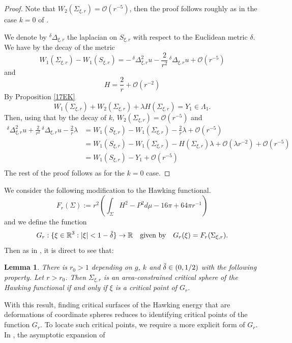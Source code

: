 \documentclass[12pt,a4paper]{amsart}
\theoremstyle{plain}
\newtheorem{lemma}[theorem]{Lemma}
\theoremstyle{definition}
\begin{document}
\begin{proof}
    Note that $W_2(\Sigma_{\xi,r}) = \mathcal{O}(r^{-5})$, then the proof follows roughly as in the case $k=0$ of \cite[Lemma 20]{eichko}.
    
   We denote by $^\delta\Delta_{\xi,r}$ the  laplacian on $S_{\xi,r}$ with respect to the Euclidean metric $\delta$.   We have by the decay of the metric 
    $$W_1(\Sigma_{\xi,r}) -W_1(S_{\xi,r}) = - \,^\delta\Delta^2_{\xi,r} u-\frac{2}{r^2}\, ^\delta\Delta_{\xi,r}u +\mathcal{O}(r^{-5})  $$
    and $$ H= \frac{2}{r} +\mathcal{O}(r^{-2}) $$
    By Proposition \ref{17EK}
$$W_1(\Sigma_{\xi,r}) + W_2(\Sigma_{\xi,r})+ \lambda H(\Sigma_{\xi,r}) =Y_1 \in \Lambda_1 .$$
Then, using that by the decay of $k$, $W_2(\Sigma_{\xi,r})=\mathcal{O}(r^{-5})$ and
\begin{equation}
    \begin{split}
      ^\delta \Delta^2_{\xi,r} u+\frac{2}{r^2}\, ^\delta\Delta_{\xi,r} u  -\frac{2}{r}\lambda &= W_1(S_{\xi,r})-W_1(\Sigma_{\xi,r})  -\frac{2}{r}\lambda  +\mathcal{O}(r^{-5})  \\
     &=  W_1(S_{\xi,r})-W_1(\Sigma_{\xi,r}) -H(\Sigma_{\xi,r}) \lambda +\mathcal{O}( \lambda r^{-2})  +\mathcal{O}(r^{-5}) \\
     &= W_1(S_{\xi,r}) - Y_1 + \mathcal{O}(r^{-5})\\
    \end{split}
\end{equation}
The rest of the proof follows as for the $k=0$ case. 
\end{proof}
We consider the following modification to the  Hawking functional. 
\begin{equation}
    F_r(\Sigma ):=r^2 \left( \int_\Sigma H^2 -P^2 d\mu -16 \pi +64\pi r^{-1} \right)
\end{equation}
and we  define the function
\[
G_r : \{\xi \in \mathbb{R}^3 : |\xi| < 1 - \Tilde{\delta} \} \to \mathbb{R} \quad \text{given by} \quad G_r(\xi) = F_r(\Sigma_{\xi,r}).
\]
Then as in \cite[Lemma 21]{eichko}, it is  direct to see that:
\begin{lemma}\label{lemma21}
    There is \(r_0 > 1\) depending on \(g\), $k$ and \(\Tilde{\delta} \in (0, 1/2)\) with the following property. Let
\(r > r_0\). Then \(\Sigma_{\xi,r}\) is an area-constrained critical sphere of the Hawking functional if and only if \(\xi\) is a critical point of \(G_r\).
\end{lemma}
With this result, finding critical surfaces of the Hawking energy that are deformations of coordinate spheres reduces to identifying critical points of the function $G_r$. To locate such critical points, we require a more explicit form of $G_r$. In \cite[Lemma 22]{eichko}, the asymptotic expansion of 
\end{document}
